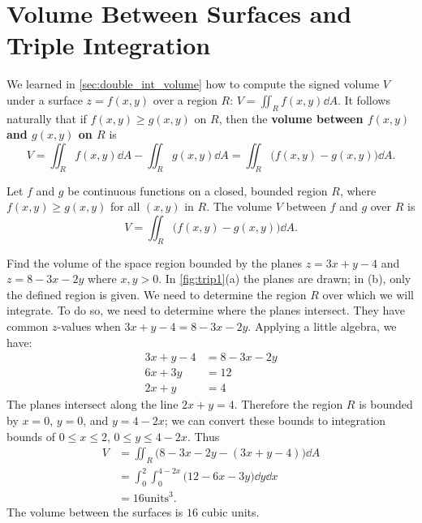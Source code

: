 \section[Volume Between Surfaces and Triple Integration]{\!Volume Between Surfaces and Triple Integration}\label{sec:triple_int}

We learned in \autoref{sec:double_int_volume} how to compute the signed volume $V$ under a surface $z=f(x,y)$ over a region $R$: $V = \iint_R f(x,y)\dd A$. It follows naturally that if $f(x,y)\geq g(x,y)$ on $R$, then the \textbf{volume between $f(x,y)$ and $g(x,y)$ on $R$} is 
\[
V = \iint_R f(x,y)\dd A - \iint_R g(x,y)\dd A = \iint_R \bigl(f(x,y)-g(x,y)\bigr)\dd A.
\]

\begin{theorem}\label{thm:volume_between_surfaces}
Let $f$ and $g$ be continuous functions on a closed, bounded region $R$, where $f(x,y)\geq g(x,y)$ for all $(x,y)$ in $R$. The volume $V$ between $f$ and $g$ over $R$ is
\[V =\iint_R \bigl(f(x,y)-g(x,y)\bigr)\dd A.\]
\end{theorem}

\begin{example}\label{ex_trip1}
Find the volume of the space region bounded by the planes $z=3x+y-4$ and $z=8-3x-2y$ where $x,y>0$. In \autoref{fig:trip1}(a) the planes are drawn; in (b), only the defined region is given.
\solution
We need to determine the region $R$ over which we will integrate. To do so, we need to determine where the planes intersect. They have common $z$-values when $3x+y-4=8-3x-2y$. Applying a little algebra, we have:
\begin{align*}
3x+y-4 &= 8-3x-2y\\
6x+3y &=12\\
2x+y &=4
\end{align*}
The planes intersect along the line $2x+y=4$. Therefore the region $R$ is bounded by $x=0$, $y=0$, and $y=4-2x$; we can convert these bounds to integration bounds of $0\leq x\leq 2$, $0\leq y\leq 4-2x$. Thus
\begin{align*}
V &= \iint_R \bigl(8-3x-2y-(3x+y-4)\bigr)\dd A \\
	&= \int_0^2\int_0^{4-2x} \bigl(12-6x-3y\bigr)\dd y\dd x\\
	&= 16\text{units}^3.
\end{align*}
The volume between the surfaces is $16$ cubic units.
\end{example}

